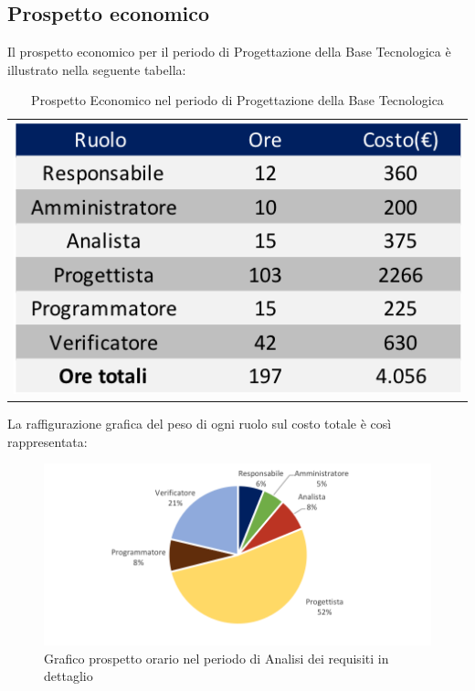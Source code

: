 \subsection{Prospetto economico}
Il prospetto economico per il periodo di Progettazione della Base Tecnologica è illustrato nella seguente tabella:

\begin{table}[!ht]
	\begin{center}
		\begin{tabular}{c}
			\includegraphics{images/tabellaProgettazioneTecnologicaEuro.png}
		\end{tabular}
		\caption{Prospetto Economico nel periodo di Progettazione della Base Tecnologica}
	\end{center}
\end{table}

La raffigurazione grafica del peso di ogni ruolo sul costo totale è così rappresentata:
\begin{figure}[!ht]
	\begin{center}
		\includegraphics{images/grafoProgettazioneTecnologicaEuro.png}
		\caption{Grafico prospetto orario nel periodo di Analisi dei requisiti in dettaglio}
	\end{center}
\end{figure}
\newpage
